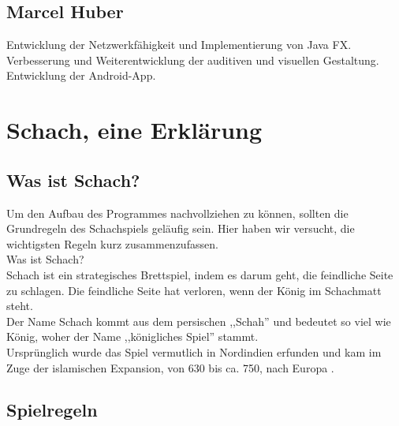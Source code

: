 \documentclass[12pt,a4paper]{article}
\begin{document}
 \subsection{Marcel Huber}
	Entwicklung der Netzwerkfähigkeit und Implementierung von Java FX.
Verbesserung und Weiterentwicklung der auditiven und visuellen Gestaltung.
Entwicklung der Android-App.


\clearpage\vfill\newpage{}

\section{Schach, eine Erklärung}
\label{SEC:CHESS}

\subsection{Was ist Schach?}
\label{SUBSEC:CHESS-EXPLAIN}
Um den Aufbau des Programmes nachvollziehen zu können, sollten die Grundregeln des Schachspiels geläufig sein. Hier haben wir versucht, die wichtigsten Regeln kurz zusammenzufassen. \\
Was ist Schach? \\
Schach ist ein strategisches Brettspiel, indem es darum geht, die feindliche Seite zu schlagen. Die feindliche Seite hat verloren, wenn der König im Schachmatt steht. \\
Der Name Schach kommt aus dem persischen ,,Schah'' und bedeutet so viel wie König, woher der Name ,,königliches Spiel'' stammt. \\
Ursprünglich wurde das Spiel vermutlich in Nordindien erfunden und kam im Zuge der islamischen Expansion, von 630 bis ca. 750, nach Europa \cite{wiki:chess}.


\subsection{Spielregeln}
\label{SUBSEC:GAMERULES}
\end{document}
